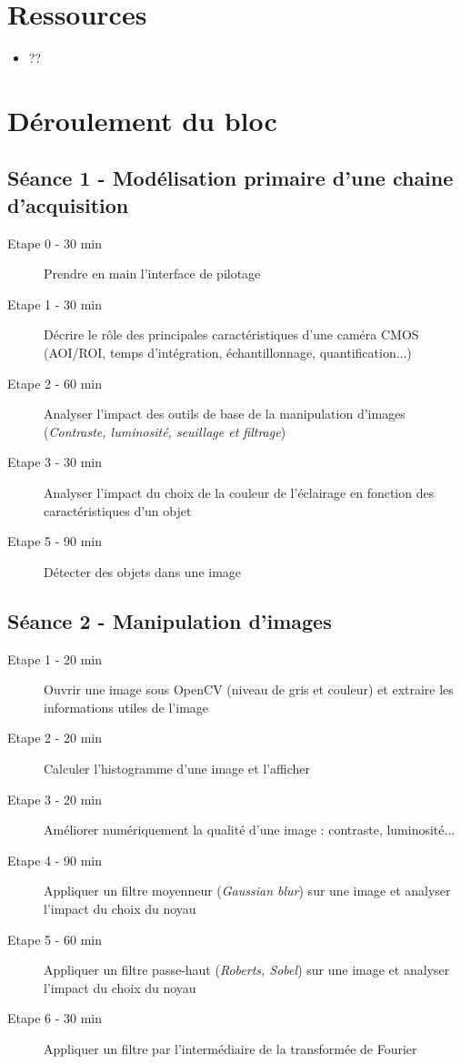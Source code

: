\documentclass[a4paper,11pt,titlepage]{article} %
\begin{document}
\section{Ressources}
\begin{itemize}
	\item ??
\end{itemize}


\newpage
\section{Déroulement du bloc}

\subsection{Séance 1 - Modélisation primaire d'une chaine d'acquisition}
\begin{description}
	\item[Etape 0 - 30 min] Prendre en main l'interface de pilotage
	\item[Etape 1 - 30 min] Décrire le rôle des principales caractéristiques d'une caméra CMOS (AOI/ROI, temps d'intégration, échantillonnage, quantification...) 
	\item[Etape 2 - 60 min] Analyser l'impact des outils de base de la manipulation d'images (\textit{Contraste, luminosité, seuillage et filtrage})
	\item[Etape 3 - 30 min] Analyser l'impact du choix de la couleur de l'éclairage en fonction des caractéristiques d'un objet
	\item[Etape 5 - 90 min] Détecter des objets dans une image
\end{description}
	
\subsection{Séance 2 - Manipulation d'images}
\begin{description}
	\item[Etape 1 - 20 min] Ouvrir une image sous OpenCV (niveau de gris et couleur) et extraire les informations utiles de l'image
	\item[Etape 2 - 20 min] Calculer l'histogramme d'une image et l'afficher
	\item[Etape 3 - 20 min] Améliorer numériquement la qualité d'une image : contraste, luminosité...
	\item[Etape 4 - 90 min] Appliquer un filtre moyenneur (\textit{Gaussian blur}) sur une image et analyser l'impact du choix du noyau
	\item[Etape 5 - 60 min] Appliquer un filtre passe-haut (\textit{Roberts, Sobel}) sur une image et analyser l'impact du choix du noyau
	\item[Etape 6 - 30 min] Appliquer un filtre par l'intermédiaire de la transformée de Fourier
\end{description}
\end{document}
